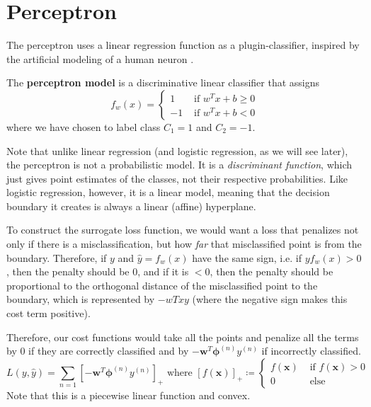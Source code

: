 \section{Perceptron} 

  The perceptron uses a linear regression function as a plugin-classifier, inspired by the artificial modeling of a human neuron \cite{1943mcculloch}. 

  \begin{definition}[Perceptron]
    The \textbf{perceptron model} is a discriminative linear classifier that assigns 
    \begin{equation}
      f_w (x) = \begin{cases} 1 & \text{ if } w^T x + b \geq 0 \\ -1 & \text { if } w^T x + b < 0 \end{cases}
    \end{equation}
    where we have chosen to label class $C_1 = 1$ and $C_2 = -1$. 
  \end{definition}

  Note that unlike linear regression (and logistic regression, as we will see later), the perceptron is not a probabilistic model. It is a \textit{discriminant function}, which just gives point estimates of the classes, not their respective probabilities. Like logistic regression, however, it is a linear model, meaning that the decision boundary it creates is always a linear (affine) hyperplane. 

  To construct the surrogate loss function, we would want a loss that penalizes not only if there is a misclassification, but how \textit{far} that misclassified point is from the boundary. Therefore, if $y$ and $\hat{y} = f_w (x)$ have the same sign, i.e. if $y f_w (x) > 0$, then the penalty should be $0$, and if it is $< 0$, then the penalty should be proportional to the orthogonal distance of the misclassified point to the boundary, which is represented by $-wT x y$ (where the negative sign makes this cost term positive). 

  \begin{definition}
    Therefore, our cost functions would take all the points and penalize all the terms by $0$ if they are correctly classified and by $-\mathbf{w}^T \boldsymbol{\phi}^{(n)} y^{(n)}$ if incorrectly classified. 
    \begin{equation}
      L(y, \hat{y}) = \sum_{n=1} [ -\mathbf{w}^T \boldsymbol{\phi}^{(n)} y^{(n)} ]_+ \text{ where } [f(\mathbf{x})]_+ \coloneqq \begin{cases} f(\mathbf{x}) & \text{ if } f(\mathbf{x}) > 0 \\ 0 & \text{ else } \end{cases}
    \end{equation}
    Note that this is a piecewise linear function and convex. 
  \end{definition}

